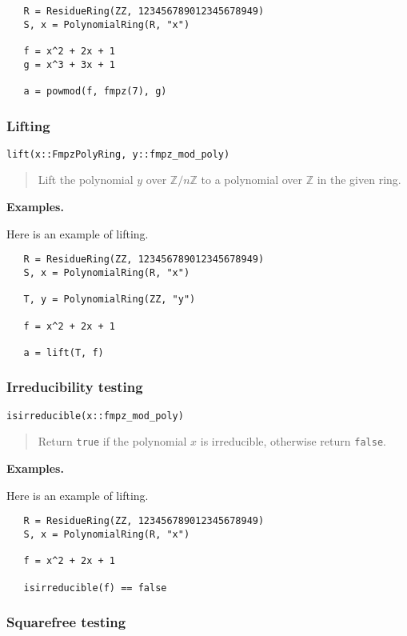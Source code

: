 \documentclass[a4paper,10pt]{article}
\newcommand{\Z}{\mathbb{Z}}
\newcommand{\code}{\lstinline}
\newcommand{\desc}[1]{\vspace{-3mm}\begin{quote}#1\end{quote}}
\begin{document}
{{\begin{lstlisting}
   R = ResidueRing(ZZ, 123456789012345678949)
   S, x = PolynomialRing(R, "x")

   f = x^2 + 2x + 1
   g = x^3 + 3x + 1
   
   a = powmod(f, fmpz(7), g) 
\end{lstlisting}

\subsubsection{Lifting}

\begin{lstlisting}
lift(x::FmpzPolyRing, y::fmpz_mod_poly)
\end{lstlisting}

\desc{Lift the polynomial $y$ over $\Z/n\Z$ to a polynomial over $\Z$ in the given ring.}

\textbf{Examples.}

Here is an example of lifting.

\begin{lstlisting}
   R = ResidueRing(ZZ, 123456789012345678949)
   S, x = PolynomialRing(R, "x")

   T, y = PolynomialRing(ZZ, "y")

   f = x^2 + 2x + 1

   a = lift(T, f) 
\end{lstlisting}

\subsubsection{Irreducibility testing}

\begin{lstlisting}
isirreducible(x::fmpz_mod_poly)
\end{lstlisting}

\desc{Return \code{true} if the polynomial $x$ is irreducible, otherwise return \code{false}.}

\textbf{Examples.}

Here is an example of lifting.

\begin{lstlisting}
   R = ResidueRing(ZZ, 123456789012345678949)
   S, x = PolynomialRing(R, "x")

   f = x^2 + 2x + 1

   isirreducible(f) == false
\end{lstlisting}

\subsubsection{Squarefree testing}

}}
\end{document}
